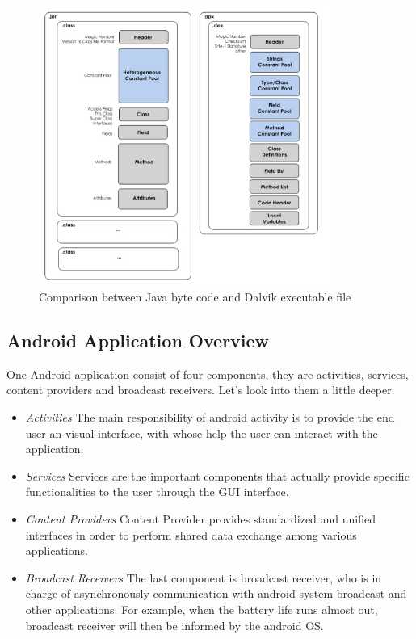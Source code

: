  \begin{figure}[!htb]
	\centering
	\includegraphics[width=0.85\textwidth]{clas-vs-dex.jpg}
		\caption{Comparison between Java byte code and Dalvik executable file\cite{android_vm}}
	\label{fig:class-vs-dex}
\end{figure}

\subsection{Android Application Overview} \label{secAppComponents}
One Android application consist of four components, they are activities, services, content providers and broadcast receivers\cite{android_secure_design}. Let's look into them a little deeper.
\begin{itemize}
\item  \emph{Activities} The main responsibility of android activity is to provide the end user an visual interface, with whose help the user can interact with the application.  
\item  \emph{Services} Services are the important components that actually provide specific functionalities to the user through the  GUI interface.
\item  \emph{Content Providers} Content Provider provides standardized and unified interfaces in order to perform shared data exchange among various applications.
\item  \emph{Broadcast Receivers} The last component is broadcast receiver, who is in charge of  asynchronously communication with android system broadcast and other applications. For example, when the battery life runs almost out, broadcast receiver will then be informed by the android OS.
\end{itemize}

